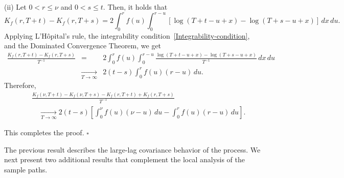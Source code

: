 \documentclass[preprint,12pt,authoryear]{elsarticle}
\begin{document}
(ii) Let \( 0 < r \leq \nu \) and \( 0 < s \leq t \). Then, it holds that
\[
K_f(r, T+t) - K_f(r, T+s) = 2\int_0^r f(u)\int_0^{r - u} \left[\log(T + t - u + x) - \log(T + s - u + x)\right]\,dx\,du.
\]
Applying L’Hôpital’s rule, the integrability condition~\eqref{Integrability-condition}, and the Dominated Convergence Theorem, we get
\begin{eqnarray*}
\frac{K_f(r, T+t) - K_f(r, T+s)}{T^{-1}} &=& 2\int_0^r f(u)\int_0^{r - u} \frac{\log(T + t - u + x) - \log(T + s - u + x)}{T^{-1}}\,dx\,du \\
&\xrightarrow[T \to \infty]{}& 2(t - s)\int_0^r f(u)(r - u)\,du.
\end{eqnarray*}
Therefore,
\begin{eqnarray*}
&&\frac{K_f(\nu, T + t) - K_f(\nu, T + s) - K_f(r, T + t) + K_f(r, T + s)}{T^{-1}} \\
&&\quad \xrightarrow[T \to \infty]{} 2(t - s) \left[\int_0^\nu f(u)(\nu - u)\,du - \int_0^r f(u)(r - u)\,du\right].
\end{eqnarray*}

This completes the proof. \hfill\(\square\)

The previous result describes the large-lag covariance behavior of the process. We next present two additional results that complement the local analysis of the sample paths.
\end{document}
